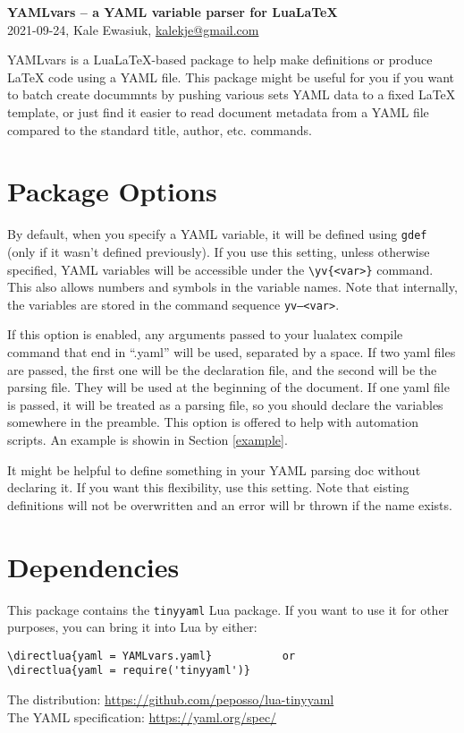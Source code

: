 \documentclass{article}
\begin{document}
{\noindent\huge\bfseries YAMLvars \LARGE -- a YAML variable parser for LuaLaTeX}\\
    2021-09-24, Kale Ewasiuk, \url{kalekje@gmail.com}

YAMLvars is a LuaLaTeX-based package to help make definitions or produce LaTeX code using a YAML file.
This package might be useful for you if you want to batch create docummnts
by pushing various sets YAML data to a fixed LaTeX template,
or just find it easier to read document metadata from a YAML file compared to the
standard title, author, etc. commands.

\section{Package Options}
\leavevmode{}By default, when you specify a YAML variable, it will be defined using \texttt{gdef}
(only if it wasn't defined previously).
If you use this setting, unless otherwise specified, YAML variables will be accessible under
the \texttt{\textbackslash yv\{<var>\}} command.
This also allows numbers and symbols in the variable names.
Note that internally, the variables are stored in the command sequence
\texttt{yv--<var>}.

\leavevmode{}If this option is enabled, any arguments passed to your lualatex compile
command that end in ``.yaml'' will be used, separated by a space.
If two yaml files are passed, the first one will be the declaration file,
and the second will be the parsing file.
They will be used at the beginning of the document.
If one yaml file is passed, it will be treated as a parsing file, so you should
declare the variables somewhere in the preamble.
This option is offered to help with automation scripts.
An example is showin in Section \ref{example}.

\leavevmode{}%
It might be helpful to define something in your YAML parsing doc without declaring it.
If you want this flexibility, use this setting. Note that eisting definitions will not be overwritten and an error
will br thrown if the name exists.

\section{Dependencies}
This package contains the \texttt{tinyyaml} Lua package.
If you want to use it for other purposes, you can bring it into Lua by either:
\begin{verbatim}
\directlua{yaml = YAMLvars.yaml}           or
\directlua{yaml = require('tinyyaml')}
\end{verbatim}
The distribution: \url{https://github.com/peposso/lua-tinyyaml}\\
The YAML specification: \url{https://yaml.org/spec/}\\
\end{document}
